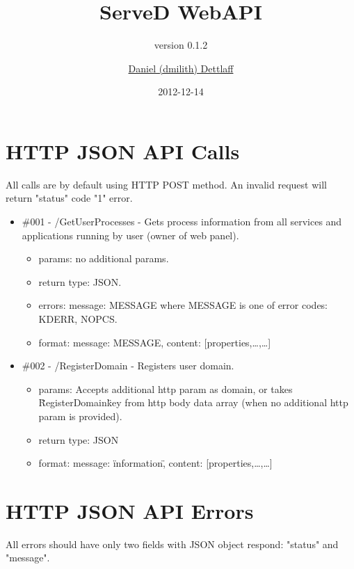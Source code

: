 \documentclass[11pt,a4paper]{scrartcl}
\title{ServeD WebAPI}
\subtitle{version 0.1.2}
\author{\href{mailto:dmilith@verknowsys.com}{Daniel (dmilith) Dettlaff}}
\date{2012-12-14}
\begin{document}
\maketitle

\section{HTTP JSON API Calls}\label{sec:apicalls}
  All calls are by default using HTTP POST method.
  An invalid request will return "status" code "1" error.

  \begin{itemize}

    \item \#001 - /GetUserProcesses - Gets process information from all services and applications running by user (owner of web panel).
      \begin{itemize}
        \item params: no additional params.
        \item return type: JSON.
        \item errors: {message: MESSAGE} where MESSAGE is one of error codes: KDERR, NOPCS.
        \item format: {message: MESSAGE, content: [{properties,…},…]}
      \end{itemize}

    \item \#002 - /RegisterDomain - Registers user domain.
      \begin{itemize}
        \item params: Accepts additional http param as domain, or takes \"RegisterDomain\" key from http body data array (when no additional http param is provided).
        \item return type: JSON
        \item format: {message: \"information\", content: [{properties,…},…]}
      \end{itemize}

  \end{itemize}


\section{HTTP JSON API Errors}\label{sec:apierrors}
  All errors should have only two fields with JSON object respond: "status" and "message".
\end{document}
